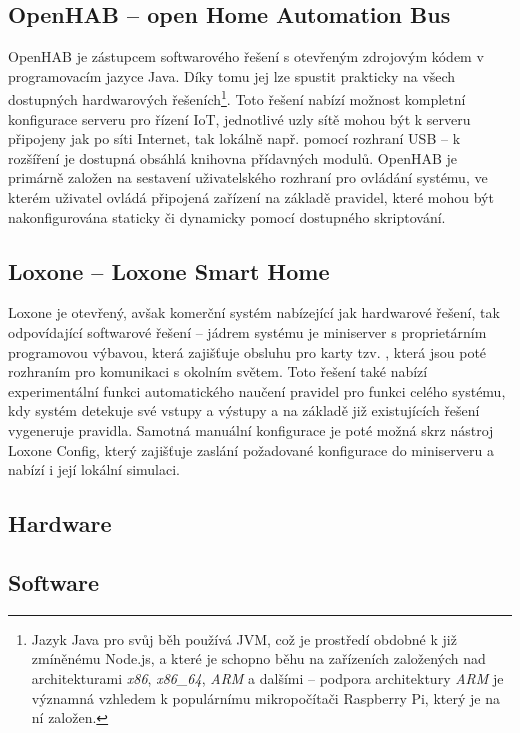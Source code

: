 \subsection{OpenHAB -- open Home Automation Bus}\label{subsec:openhab}
OpenHAB je zástupcem softwarového řešení s otevřeným zdrojovým kódem v programovacím jazyce Java.
Díky tomu jej lze spustit prakticky na všech dostupných hardwarových řešeních\footnote{Jazyk Java pro svůj běh
používá JVM, což je prostředí obdobné k již zmíněnému Node.js, a které je schopno běhu na zařízeních založených nad
architekturami \textit{x86}, \textit{x86\_64}, \textit{ARM} a dalšími -- podpora architektury \textit{ARM} je
významná vzhledem k populárnímu mikropočítači Raspberry Pi, který je na ní založen.}.
Toto řešení nabízí možnost kompletní konfigurace serveru pro řízení IoT, jednotlivé uzly sítě mohou být k serveru
připojeny jak po síti Internet, tak lokálně např. pomocí rozhraní USB -- k rozšíření je dostupná obsáhlá
knihovna přídavných modulů.
OpenHAB je primárně založen na sestavení uživatelského rozhraní pro ovládání systému, ve kterém uživatel ovládá
připojená zařízení na základě pravidel, které mohou být nakonfigurována staticky či dynamicky pomocí dostupného
skriptování.

\subsection{Loxone -- Loxone Smart Home}\label{subsec:loxone}
Loxone je otevřený, avšak komerční systém nabízející jak hardwarové řešení, tak odpovídající softwarové řešení --
jádrem systému je miniserver s proprietárním programovou výbavou, která zajišťuje obsluhu pro karty tzv. , která jsou poté rozhraním pro komunikaci s okolním světem.
Toto řešení také nabízí experimentální funkci automatického naučení pravidel pro funkci celého systému, kdy
systém detekuje své vstupy a výstupy a na základě již existujících řešení vygeneruje pravidla.
Samotná manuální konfigurace je poté možná skrz nástroj Loxone Config, který zajišťuje zaslání požadované
konfigurace do miniserveru a nabízí i její lokální simulaci.


\subsection{Hardware}

\subsection{Software}

